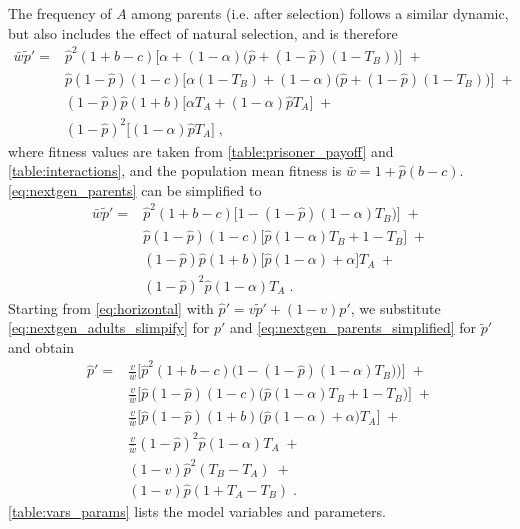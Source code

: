 \documentclass[12pt]{extarticle}
\begin{document}
The frequency of $A$ among parents (i.e. after selection) follows a similar dynamic, but also includes the effect of natural selection, and is therefore
\begin{equation}\label{eq:nextgen_parents}
\begin{aligned}
\bar{w} \tilde{p}' =
& \hat{p}^2 (1+b-c) \big[\alpha + (1-\alpha)\big(\hat{p} + (1-\hat{p})(1-T_B)\big)\big] \;+ \\
& \hat{p}(1-\hat{p}) (1-c) \big[\alpha(1-T_B) + (1-\alpha)\big(\hat{p} + (1-\hat{p})(1-T_B)\big)\big] \;+ \\
& (1-\hat{p})\hat{p} (1+b) \big[\alpha T_A + (1-\alpha) \hat{p} T_A \big] \;+ \\
& (1-\hat{p})^2 \big[(1-\alpha) \hat{p} T_A \big] \;,
\end{aligned}
\end{equation}
where fitness values are taken from \autoref{table:prisoner_payoff} and \autoref{table:interactions}, and the population mean fitness is
$\bar{w} =  1 + \hat{p}(b-c)$.
\autoref{eq:nextgen_parents} can be simplified to
\begin{equation}\label{eq:nextgen_parents_simplified}
\begin{aligned}
\bar{w} \tilde{p}' =
& \hat{p}^2 (1+b-c) \big[1-(1-\hat{p})(1-\alpha)T_B)\big] \;+ \\
& \hat{p}(1-\hat{p}) (1-c) \big[\hat{p}(1-\alpha)T_B+1-T_B \big] \;+ \\
& (1-\hat{p})\hat{p} (1+b) \big[\hat{p}(1-\alpha) + \alpha \big] T_A \;+ \\
& (1-\hat{p})^2 \hat{p} (1-\alpha) T_A \;.
\end{aligned}
\end{equation}
Starting from \autoref{eq:horizontal} with $\hat{p}'=v\tilde{p}'+(1-v)p'$, we substitute \autoref{eq:nextgen_adults_slimpify} for $p'$ and \autoref{eq:nextgen_parents_simplified} for $\tilde{p}'$ and obtain
\begin{equation} \label{eq:nextgen_juveniles}
\begin{aligned}
\hat{p}' =
& \frac{v}{\bar{w}}\Big[\hat{p}^2(1+b-c)\Big(1-(1-\hat{p})(1-\alpha)T_B)\Big)\Big] \;+ \\
& \frac{v}{\bar{w}}\Big[ \hat{p}(1-\hat{p})(1-c)\big( \hat{p}(1-\alpha)T_B + 1 - T_B \big) \Big] \;+ \\
& \frac{v}{\bar{w}}\Big[ \hat{p}(1-\hat{p})(1+b)\big(\hat{p}(1-\alpha) + \alpha \big) T_A \Big] \;+ \\
& \frac{v}{\bar{w}}(1-\hat{p})^2\hat{p}(1-\alpha)T_A \;+ \\
& (1-v)\hat{p}^2(T_B-T_A) \;+ \\
& (1-v)\hat{p}(1+T_A-T_B) \;.
\end{aligned}
\end{equation}
\autoref{table:vars_params} lists the model variables and parameters.
\end{document}
